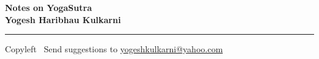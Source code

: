 
\usepackage{polyglossia}
\setdefaultlanguage{sanskrit}

\usepackage{fontspec}
\setmainfont{Segoe UI}
\newfontfamily{}
\newfontfamily{}


\graphicspath{{images/}}



\footnotesize


\begin{center}
\Large{\textbf{Notes on YogaSutra\\ Yogesh Haribhau Kulkarni}}  
\end{center}

\begin{multicols}{2}

\end{multicols}

\rule{\linewidth}{0.25pt}
\scriptsize
Copyleft \textcopyleft\  Send suggestions to 
\href{http://www.yogeshkulkarni.com}{yogeshkulkarni@yahoo.com}



